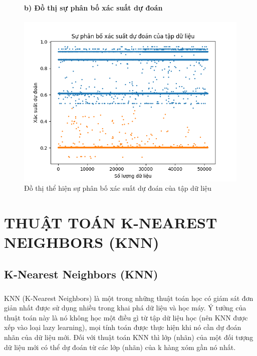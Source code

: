 \documentclass{report}
\newcommand\tab[1][1.25cm]{\hspace*{#1}}
\begin{document}
        \begin{center}
            \begin{figure}[htp]
                \fontsize{14}{10}\selectfont
                \subsubsection{b) Đồ thị sự phân bố xác suất dự đoán}
                \begin{center}
                    \includegraphics[scale = 0.7]{image/plot_predict_mlp.png}
                    \caption{Đồ thị thể hiện sự phân bố xác suất dự đoán của tập dữ liệu}
                \end{center}
            \end{figure}
        \end{center}
        
\fontsize{18}{10}\selectfont
\chapter{THUẬT TOÁN K-NEAREST NEIGHBORS (KNN)}
    \fontsize{16}{10}\selectfont
    \section{K-Nearest Neighbors (KNN)}
        \fontsize{13}{10}\selectfont\paragraph{}
            KNN (K-Nearest Neighbors) là một trong những thuật toán học có giám sát đơn giản nhất được sử dụng nhiều trong khai phá dữ liệu và học máy. Ý tưởng của thuật toán này là nó không học một điều gì từ tập dữ liệu học (nên KNN được xếp vào loại lazy learning), mọi tính toán được thực hiện khi nó cần dự đoán nhãn của dữ liệu mới.
            \vspace{0.2cm}\newline\tab[0.4cm] Đối với thuật toán KNN thì lớp (nhãn) của một đối tượng dữ liệu mới có thể dự đoán từ các lớp (nhãn) của k hàng xóm gần nó nhất.
    
\end{document}
